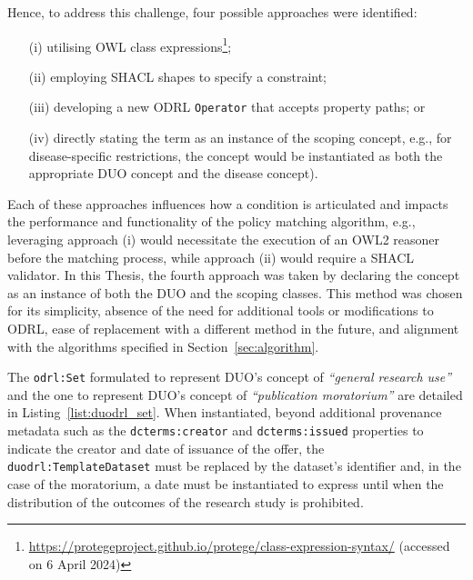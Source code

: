 Hence, to address this challenge, four possible approaches were identified:
\begin{enumerate}
    \item [(i)] utilising OWL class expressions\footnote{\url{https://protegeproject.github.io/protege/class-expression-syntax/} (accessed on 6 April 2024)};
    \item [(ii)] employing SHACL shapes to specify a constraint;
    \item [(iii)] developing a new ODRL \texttt{Operator} that accepts property paths; or
    \item [(iv)] directly stating the term as an instance of the scoping concept, e.g., for disease-specific restrictions, the concept would be instantiated as both the appropriate DUO concept and the disease concept).
\end{enumerate}
Each of these approaches influences how a condition is articulated and impacts the performance and functionality of the policy matching algorithm, e.g., leveraging approach (i) would necessitate the execution of an OWL2 reasoner before the matching process, while approach (ii) would require a SHACL validator.
In this Thesis, the fourth approach was taken by declaring the concept as an instance of both the DUO and the scoping classes.
This method was chosen for its simplicity, absence of the need for additional tools or modifications to ODRL, ease of replacement with a different method in the future, and alignment with the algorithms specified in Section~\ref{sec:algorithm}.

The \texttt{odrl:Set} formulated to represent DUO's concept of \textit{``general research use''} and the one to represent DUO's concept of \textit{``publication moratorium''} are detailed in Listing~\ref{list:duodrl_set}.
When instantiated, beyond additional provenance metadata such as the \texttt{dcterms:creator} and \texttt{dcterms:issued} properties to indicate the creator and date of issuance of the offer, the \texttt{duodrl:TemplateDataset} must be replaced by the dataset's identifier and, in the case of the moratorium, a date must be instantiated to express until when the distribution of the outcomes of the research study is prohibited. 

